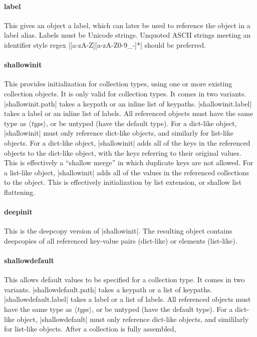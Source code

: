 \documentclass[11pt]{article}
\newcommand{\vmeta}[1]{{\color{DarkRed}\ensuremath{\langle}\textit{#1}\ensuremath{\rangle}}}
\begin{document}
{{\paragraph{label}
This gives an object a label, which can later be used to reference the object in a label alias.  Labels must be Unicode strings.  Unquoted ASCII strings meeting an identifier style regex |[a-zA-Z][a-zA-Z0-9_-]*| should be preferred.


\paragraph{shallowinit}

This provides initialization for collection types, using one or more existing collection objects.  It is only valid for collection types.  It comes in two variants. |shallowinit.path| takes a keypath or an inline list of keypaths.  |shallowinit.label| takes a label or an inline list of labels.  All referenced objects must have the same type as \vmeta{type}, or be untyped (have the default type).  For a dict-like object, |shallowinit| must only reference dict-like objects, and similarly for list-like objects.  For a dict-like object, |shallowinit| adds all of the keys in the referenced objects to the dict-like object, with the keys referring to their original values.  This is effectively a ``shallow merge'' in which duplicate keys are not allowed.  For a list-like object, |shallowinit| adds all of the values in the referenced collections to the object.  This is effectively initialization by list extension, or shallow list flattening.


\paragraph{deepinit}

This is the deepcopy version of |shallowinit|.  The resulting object contains deepcopies of all referenced key-value pairs (dict-like) or elements (list-like).


\paragraph{shallowdefault}

This allows default values to be specified for a collection type.  It comes in two variants. |shallowdefault.path| takes a keypath or a list of keypaths.  |shallowdefault.label| takes a label or a list of labels.  All referenced objects must have the same type as \vmeta{type}, or be untyped (have the default type).  For a dict-like object, |shallowdefault| must only reference dict-like objects, and simililarly for list-like objects.  After a collection is fully assembled, 


}}
\end{document}
